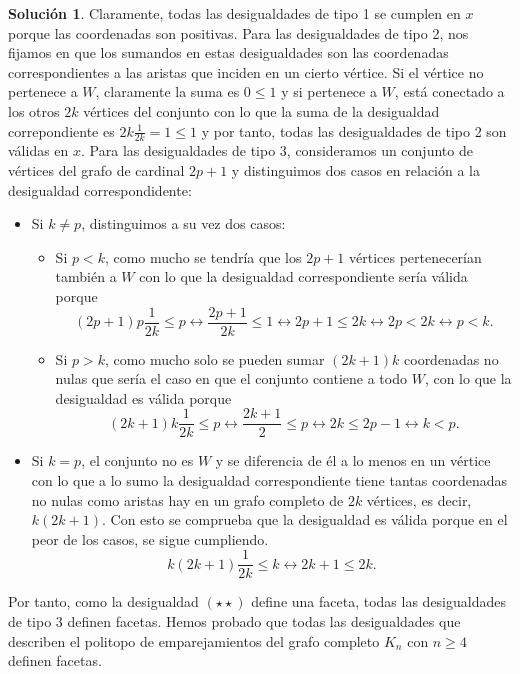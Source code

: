 \documentclass[10pt]{article}
\theoremstyle{definition}
\newtheorem*{sol}{Solución}
\begin{document}
\begin{sol}
Claramente, todas las desigualdades de tipo 1 se cumplen en $x$ porque las coordenadas son positivas.
Para las desigualdades de tipo 2, nos fijamos en que los sumandos en estas desigualdades son las coordenadas correspondientes a las aristas que inciden en un cierto vértice. Si el vértice no pertenece a $W$, claramente la suma es $0\leq 1$ y si pertenece a $W$, está conectado a los otros $2k$ vértices del conjunto con lo que la suma de la desigualdad correpondiente es $2k\frac{1}{2k}=1\leq 1$ y por tanto, todas las desigualdades de tipo 2 son válidas en $x$. Para las desigualdades de tipo 3, consideramos un conjunto de vértices del grafo de cardinal $2p+1$ y distinguimos dos casos en relación a la desigualdad correspondidente:
\begin{itemize}
\item Si $k\neq p$, distinguimos a su vez dos casos:
\begin{itemize}
\item Si $p<k$, como mucho se tendría que los $2p+1$ vértices pertenecerían también a $W$ con lo que la desigualdad correspondiente sería válida porque $$(2p+1)p\frac{1}{2k}\leq p\longleftrightarrow \frac{2p+1}{2k}\leq 1\longleftrightarrow 2p+1\leq 2k\longleftrightarrow 2p<2k\longleftrightarrow p<k.$$
\item Si $p>k$, como mucho solo se pueden sumar $(2k+1)k$ coordenadas no nulas que sería el caso en que el conjunto contiene a todo $W$, con lo que la desigualdad es válida porque 
$$(2k+1)k\frac{1}{2k}\leq p\longleftrightarrow \frac{2k+1}{2}\leq p\longleftrightarrow 2k\leq 2p-1\longleftrightarrow k<p.$$
\end{itemize}
\item Si $k=p$, el conjunto no es $W$ y se diferencia de él a lo menos en un vértice con lo que a lo sumo la desigualdad correspondiente tiene tantas coordenadas no nulas como aristas hay en un grafo completo de $2k$ vértices, es decir, $k(2k+1)$. Con esto se comprueba que la desigualdad es válida porque en el peor de los casos, se sigue cumpliendo.
$$k(2k+1)\frac{1}{2k}\leq k\longleftrightarrow 2k+1\leq 2k.$$
\end{itemize}

Por tanto, como la desigualdad $(\star\star)$ define una faceta, todas las desigualdades de tipo 3 definen facetas. Hemos probado que todas las desigualdades que describen el politopo de emparejamientos del grafo completo $K_n$ con $n\geq 4$ definen facetas.
\end{sol}
\end{document}
